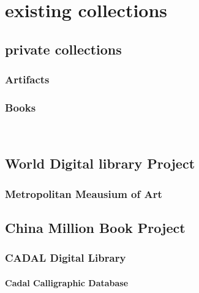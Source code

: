 \chapter{existing collections}

\section{private collections}

\subsection{Artifacts}

\subsection{Books}

\

\section{World Digital library Project}

\subsection{Metropolitan Meausium of Art}

\section{China Million Book Project}

\subsection{CADAL Digital Library}

\subsubsection{Cadal Calligraphic Database}


